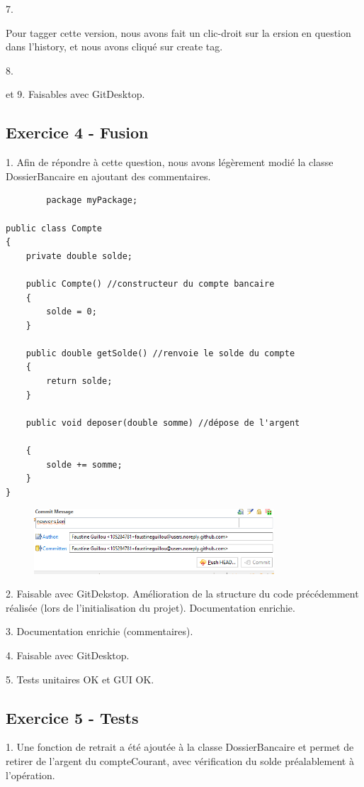 \documentclass{article}
\begin{document}
7.

Pour tagger cette version, nous avons fait un clic-droit sur la ersion en question dans l'history, et nous avons cliqué sur create tag.

8.

et 9.
Faisables avec GitDesktop.


\subsection{Exercice 4 - Fusion}

1.
Afin de répondre à cette question, nous avons légèrement modié la classe DossierBancaire en ajoutant des commentaires.
\begin{lstlisting}
        package myPackage;

public class Compte
{
	private double solde;
	
	public Compte() //constructeur du compte bancaire
	{
		solde = 0;
	}
	
	public double getSolde() //renvoie le solde du compte
	{
		return solde;
	}
	
	public void deposer(double somme) //dépose de l'argent
   
	{
		solde += somme;
	}
}
\end{lstlisting}
\begin{figure}[h]
\includegraphics[width=0.8\textwidth]{commit.png}
\end{figure}
2.
Faisable avec GitDekstop. Amélioration de la structure du code précédemment réalisée (lors de l'initialisation du projet). Documentation enrichie.

3.
Documentation enrichie (commentaires).

4.
Faisable avec GitDesktop. 

5.
Tests unitaires OK et GUI OK.

\newpage
\subsection{Exercice 5 - Tests}
1.
Une fonction de retrait a été ajoutée à la classe DossierBancaire et permet de retirer de l'argent du compteCourant, avec vérification du 
solde préalablement à l'opération.
\end{document}
